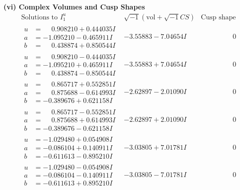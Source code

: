 \documentclass[1p]{elsarticle_modified}
\theoremstyle{definition}
\newcommand{\I}{\sqrt{-1}}
\begin{document}
\newpage\flushleft \textbf{(vi) Complex Volumes and Cusp Shapes}
$$\begin{array}{c|c|c}  
\text{Solutions to }I^u_{1}& \I (\text{vol} + \sqrt{-1}CS) & \text{Cusp shape}\\
 \hline 
\begin{aligned}
u &= \phantom{-}0.908210 + 0.444035 I \\
a &= -1.095210 - 0.465911 I \\
b &= \phantom{-}0.438874 + 0.850544 I\end{aligned}
 & -3.55883 - 7.04654 I & \phantom{-0.000000 } 0 \\ \hline\begin{aligned}
u &= \phantom{-}0.908210 - 0.444035 I \\
a &= -1.095210 + 0.465911 I \\
b &= \phantom{-}0.438874 - 0.850544 I\end{aligned}
 & -3.55883 + 7.04654 I & \phantom{-0.000000 } 0 \\ \hline\begin{aligned}
u &= \phantom{-}0.865717 + 0.552851 I \\
a &= \phantom{-}0.875688 - 0.614993 I \\
b &= -0.389676 + 0.621158 I\end{aligned}
 & -2.62897 - 2.01090 I & \phantom{-0.000000 } 0 \\ \hline\begin{aligned}
u &= \phantom{-}0.865717 - 0.552851 I \\
a &= \phantom{-}0.875688 + 0.614993 I \\
b &= -0.389676 - 0.621158 I\end{aligned}
 & -2.62897 + 2.01090 I & \phantom{-0.000000 } 0 \\ \hline\begin{aligned}
u &= -1.029480 + 0.054908 I \\
a &= -0.086104 + 0.140911 I \\
b &= -0.611613 - 0.895210 I\end{aligned}
 & -3.03805 + 7.01781 I & \phantom{-0.000000 } 0 \\ \hline\begin{aligned}
u &= -1.029480 - 0.054908 I \\
a &= -0.086104 - 0.140911 I \\
b &= -0.611613 + 0.895210 I\end{aligned}
 & -3.03805 - 7.01781 I & \phantom{-0.000000 } 0 \\ \hline\begin{aligned}

\end{aligned}
\end{array}$$
\end{document}
